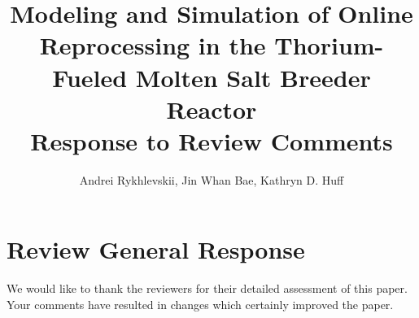 \documentclass[answers,11pt]{exam}
\begin{document}


%

\title{Modeling and Simulation of Online Reprocessing in the Thorium-Fueled 
        Molten Salt Breeder Reactor\\
\large Response to Review Comments}
\author{Andrei Rykhlevskii, Jin Whan Bae, Kathryn D. Huff}



%
\maketitle
\section*{Review General Response}
We would like to thank the reviewers for their detailed assessment of
this paper. Your comments have resulted in changes which certainly improved the 
paper.
\end{document}
